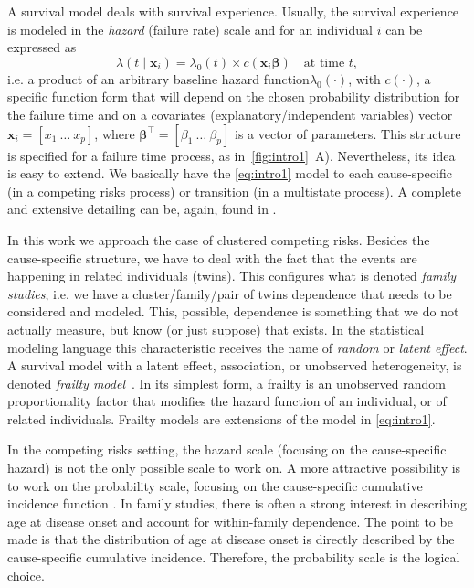 A survival model deals with survival experience. Usually, the survival
experience is modeled in the \textit{hazard} (failure rate) scale and
for an individual \(i\) can be expressed as
\begin{equation}
  \lambda(t \mid \bm{x}_{i}) =
  \lambda_{0}(t) \times c(\bm{x}_{i} \bm{\beta})
  \quad \text{at time } t,
  \label{eq:intro1}
\end{equation}
i.e. a product of an arbitrary baseline hazard
function\(\lambda_{0}(\cdot)\), with \(c(\cdot)\), a specific function
form that will depend on the chosen probability distribution for the
failure time and on a covariates (explanatory/independent variables)
vector \(\bm{x}_{i} = [x_{1}~\dots~x_{p}]\), where \(\bm{\beta}^{\top} =
[\beta_{1}~\dots~\beta_{p}]\) is a vector of parameters. This structure
is specified for a failure time process, as in~\autoref{fig:intro1}~A).
Nevertheless, its idea is easy to extend. We basically have the
\autoref{eq:intro1} model to each cause-specific (in a competing risks
process) or transition (in a multistate process). A complete and
extensive detailing can be, again, found in .

In this work we approach the case of clustered competing risks. Besides
the cause-specific structure, we have to deal with the fact that the
events are happening in related individuals (twins). This configures
what is denoted \textit{family studies}, i.e. we have a
cluster/family/pair of twins dependence that needs to be considered and
modeled. This, possible, dependence is something that we do not actually
measure, but know (or just suppose) that exists. In the statistical
modeling language this characteristic receives the name of
\textit{random} or \textit{latent effect}. A survival model with a
latent effect, association, or unobserved heterogeneity, is denoted
\textit{frailty model}~\cite{frailty78, frailty79}. In its simplest
form, a frailty is an unobserved random proportionality factor that
modifies the hazard function of an individual, or of related
individuals. Frailty models are extensions of the model in
\autoref{eq:intro1}.

In the competing risks setting, the hazard scale (focusing on the
cause-specific hazard) is not the only possible scale to work on. A more
attractive possibility is to work on the probability scale, focusing on
the cause-specific cumulative incidence function \cite[CIF]{andersen12}.
In family studies, there is often a strong interest in describing age at
disease onset and account for within-family dependence. The point to be
made is that the distribution of age at disease onset is directly
described by the cause-specific cumulative incidence. Therefore, the
probability scale is the logical choice.

